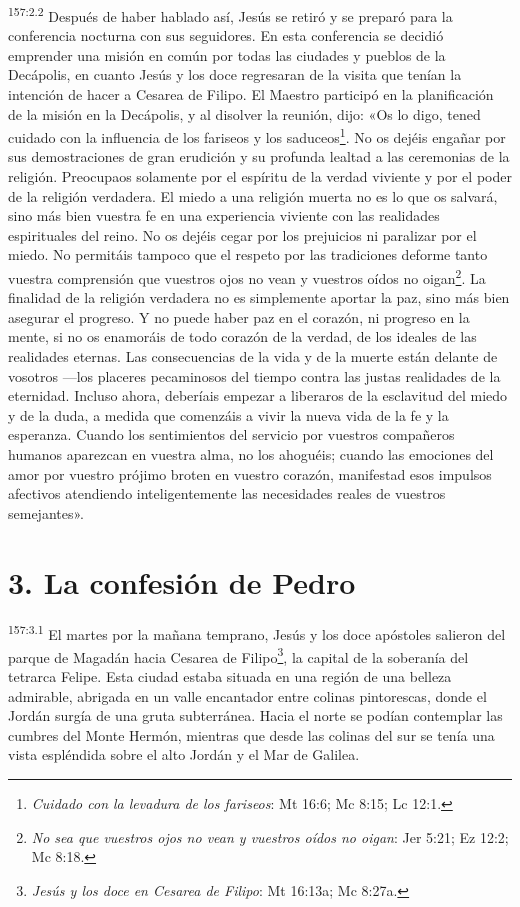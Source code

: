 \par
\textsuperscript{157:2.2} Después de haber hablado así, Jesús se retiró y se preparó para la conferencia nocturna con sus seguidores. En esta conferencia se decidió emprender una misión en común por todas las ciudades y pueblos de la Decápolis, en cuanto Jesús y los doce regresaran de la visita que tenían la intención de hacer a Cesarea de Filipo. El Maestro participó en la planificación de la misión en la Decápolis, y al disolver la reunión, dijo: «Os lo digo, tened cuidado con la influencia de los fariseos y los saduceos\footnote{\textit{Cuidado con la levadura de los fariseos}: Mt 16:6; Mc 8:15; Lc 12:1.}. No os dejéis engañar por sus demostraciones de gran erudición y su profunda lealtad a las ceremonias de la religión. Preocupaos solamente por el espíritu de la verdad viviente y por el poder de la religión verdadera. El miedo a una religión muerta no es lo que os salvará, sino más bien vuestra fe en una experiencia viviente con las realidades espirituales del reino. No os dejéis cegar por los prejuicios ni paralizar por el miedo. No permitáis tampoco que el respeto por las tradiciones deforme tanto vuestra comprensión que vuestros ojos no vean y vuestros oídos no oigan\footnote{\textit{No sea que vuestros ojos no vean y vuestros oídos no oigan}: Jer 5:21; Ez 12:2; Mc 8:18.}. La finalidad de la religión verdadera no es simplemente aportar la paz, sino más bien asegurar el progreso. Y no puede haber paz en el corazón, ni progreso en la mente, si no os enamoráis de todo corazón de la verdad, de los ideales de las realidades eternas. Las consecuencias de la vida y de la muerte están delante de vosotros ---los placeres pecaminosos del tiempo contra las justas realidades de la eternidad. Incluso ahora, deberíais empezar a liberaros de la esclavitud del miedo y de la duda, a medida que comenzáis a vivir la nueva vida de la fe y la esperanza. Cuando los sentimientos del servicio por vuestros compañeros humanos aparezcan en vuestra alma, no los ahoguéis; cuando las emociones del amor por vuestro prójimo broten en vuestro corazón, manifestad esos impulsos afectivos atendiendo inteligentemente las necesidades reales de vuestros semejantes».

\section*{3. La confesión de Pedro}
\par
\textsuperscript{157:3.1} El martes por la mañana temprano, Jesús y los doce apóstoles salieron del parque de Magadán hacia Cesarea de Filipo\footnote{\textit{Jesús y los doce en Cesarea de Filipo}: Mt 16:13a; Mc 8:27a.}, la capital de la soberanía del tetrarca Felipe. Esta ciudad estaba situada en una región de una belleza admirable, abrigada en un valle encantador entre colinas pintorescas, donde el Jordán surgía de una gruta subterránea. Hacia el norte se podían contemplar las cumbres del Monte Hermón, mientras que desde las colinas del sur se tenía una vista espléndida sobre el alto Jordán y el Mar de Galilea.


